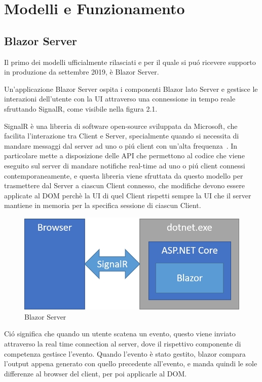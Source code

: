 \chapter{Modelli e Funzionamento}\label{cap:modefunz}
\section{Blazor Server}\label{sez:bserver}
Il primo dei modelli ufficialmente rilasciati e per il quale si pu\'o ricevere supporto in produzione da settembre 2019\cite{blazorServerRelease}, \`e Blazor Server.

Un'applicazione Blazor Server ospita i componenti Blazor lato Server e gestisce le interazioni dell'utente con la UI attraverso una connessione in tempo reale sfruttando SignalR, come visibile nella figura 2.1.

SignalR \`e una libreria di software open-source sviluppata da Microsoft, che facilita l'interazione tra Client e Server, specialmente quando si necessita di mandare messaggi dal server ad uno o pi\'u client con un'alta frequenza~\cite{signalR}.
In particolare mette a disposizione delle API che permettono al codice che viene eseguito sul server di mandare notifiche real-time ad uno o pi\'u client connessi contemporaneamente, e questa libreria viene sfruttata da questo modello per trasmettere dal Server a ciascun Client connesso, che modifiche devono essere applicate al DOM perch\`e la UI di quel Client rispetti sempre la UI che il server mantiene in memoria per la specifica sessione di ciascun Client.

\begin{figure}[H]
	\centerline{\includegraphics[scale=0.6]{figure/blazor-server.png}}
	\caption{Blazor Server}
	\label{fig:BlazorServer}
\end{figure}

Ci\'o significa che quando un utente scatena un evento, questo viene inviato attraverso la real time connection al server, dove il rispettivo componente di competenza gestisce l'evento.
Quando l'evento \`e stato gestito, blazor compara l'output appena generato con quello precedente all'evento, e manda quindi le sole differenze al browser del client, per poi applicarle al DOM.\cite{blazorModelsScenarios}

